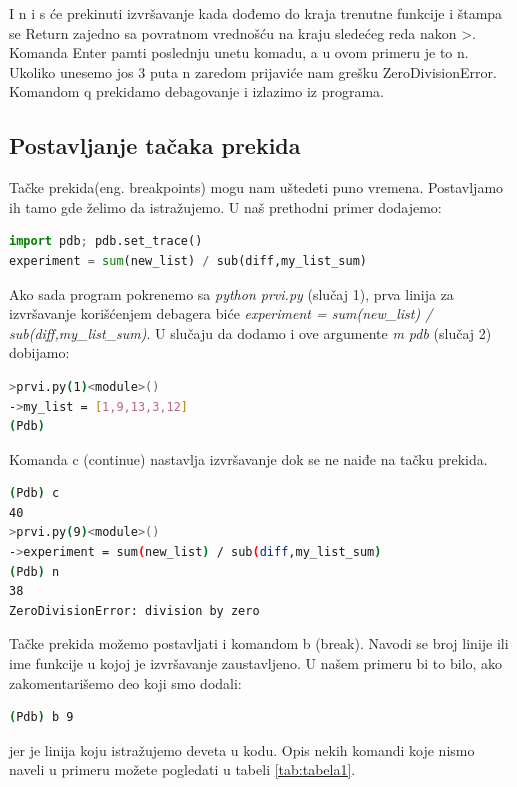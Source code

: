 \documentclass[a4paper]{article}
\begin{document}
I n i s će prekinuti izvršavanje kada dođemo do kraja trenutne funkcije i štampa se \textendash \textendash Return \textendash\textendash zajedno sa povratnom vrednošću na kraju sledećeg reda nakon \textendash>. Komanda Enter pamti poslednju unetu komadu, a u ovom primeru je to n. Ukoliko unesemo jos 3 puta n zaredom prijaviće nam grešku ZeroDivisionError. Komandom q prekidamo debagovanje i izlazimo iz programa.
\subsection{Postavljanje tačaka prekida}
Tačke prekida(eng. breakpoints) mogu nam uštedeti puno vremena. Postavljamo ih tamo gde želimo da istražujemo. U naš prethodni primer dodajemo:
\begin{lstlisting}[language = python, caption = {U primer prvi.py na ovom mestu dodata prva linija}]
import pdb; pdb.set_trace()
experiment = sum(new_list) / sub(diff,my_list_sum)
\end{lstlisting}

Ako sada program pokrenemo sa \emph{python prvi.py} (slučaj 1), prva linija za izvršavanje korišćenjem debagera biće \emph{experiment = sum(new\_list) / sub(diff,my\_list\_sum)}. U slučaju da dodamo i ove argumente \emph{\textendash m  pdb} (slučaj 2) dobijamo:
\begin{lstlisting}[language = bash, caption={U slučaju 2 izvršavanje kreće od prve linije}]
>prvi.py(1)<module>()
->my_list = [1,9,13,3,12]
(Pdb)
\end{lstlisting}
Komanda c (continue) nastavlja izvršavanje dok se ne naiđe na tačku prekida.
\begin{lstlisting}[language = bash, caption={Nastavlja se izvršavanje do tačke prekida i izvršava sledeću liniju}]
(Pdb) c
40
>prvi.py(9)<module>()
->experiment = sum(new_list) / sub(diff,my_list_sum)
(Pdb) n
38
ZeroDivisionError: division by zero
\end{lstlisting}

Tačke prekida možemo postavljati i komandom b (break). Navodi se broj linije ili ime funkcije u kojoj je izvršavanje zaustavljeno. U našem primeru bi to bilo, ako zakomentarišemo deo koji smo dodali:
\begin{lstlisting}[language = bash, caption={Na liniji 9 postavljamo tačku prekida}]
(Pdb) b 9 
\end{lstlisting}
jer je linija koju istražujemo deveta u kodu.
Opis nekih komandi koje nismo naveli u primeru možete pogledati u tabeli \ref{tab:tabela1}.
\end{document}
